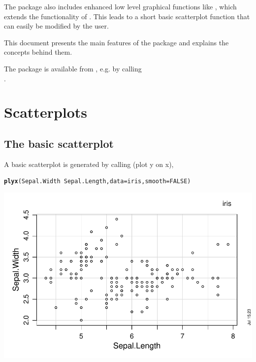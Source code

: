 \documentclass[11pt]{article}\usepackage[]{graphicx}\usepackage[]{color}
\makeatletter
\def\maxwidth{ %
  \ifdim\Gin@nat@width>\linewidth
    \linewidth
  \else
    \Gin@nat@width
  \fi
}
\newcommand{\hlnum}[1]{\textcolor[rgb]{0.686,0.059,0.569}{#1}}%
\newcommand{\hlopt}[1]{\textcolor[rgb]{0,0,0}{#1}}%
\newcommand{\hlstd}[1]{\textcolor[rgb]{0.345,0.345,0.345}{#1}}%
\newcommand{\hlkwc}[1]{\textcolor[rgb]{0.333,0.667,0.333}{#1}}%
\newcommand{\hlkwd}[1]{\textcolor[rgb]{0.737,0.353,0.396}{\textbf{#1}}}%
\newenvironment{kframe}{%
 \def\at@end@of@kframe{}%
 \ifinner\ifhmode%
  \def\at@end@of@kframe{\end{minipage}}%
  \begin{minipage}{\columnwidth}%
 \fi\fi%
 \def\FrameCommand##1{\hskip\@totalleftmargin \hskip-\fboxsep
 \colorbox{shadecolor}{##1}\hskip-\fboxsep
     \hskip-\linewidth \hskip-\@totalleftmargin \hskip\columnwidth}%
 \MakeFramed {\advance\hsize-\width
   \@totalleftmargin\z@ \linewidth\hsize
   \@setminipage}}%
 {\par\unskip\endMakeFramed%
 \at@end@of@kframe}
\newenvironment{knitrout}{}{} %
\makeatother
\begin{document}
The package also includes enhanced low level graphical functions
like , which extends the functionality of .
This leads to a short basic scatterplot function  that can
easily be modified by the user.

This document presents the main features of the package 
and explains the concepts behind them. 

The package is available from , e.g. by calling\\
.\\

\section{Scatterplots}

\subsection{The basic scatterplot}
A basic scatterplot is generated by calling 
(plot y on x),
\begin{knitrout}
\color{fgcolor}\begin{kframe}
\begin{alltt}
\hlkwd{plyx}\hlstd{(Sepal.Width}\hlopt{~}\hlstd{Sepal.Length,} \hlkwc{data}\hlstd{=iris,} \hlkwc{smooth}\hlstd{=}\hlnum{FALSE}\hlstd{)}
\end{alltt}
\end{kframe}
\includegraphics[width=\maxwidth]{figure/plyx-1} 
\end{knitrout}
\end{document}
